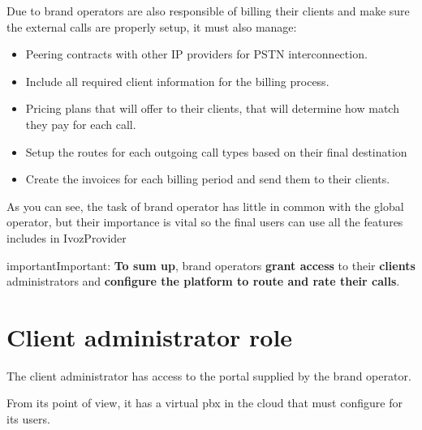 \documentclass[letterpaper,10pt,english]{sphinxmanual}
\begin{document}
Due to brand operators are also responsible of billing their clients and
make sure the external calls are properly setup, it must also manage:
\begin{itemize}
\item {} 
Peering contracts with other IP providers for PSTN interconnection.

\item {} 
Include all required client information for the billing process.

\item {} 
Pricing plans that will offer to their clients, that will determine how
match they pay for each call.

\item {} 
Setup the routes for each outgoing call types based on their final
destination

\item {} 
Create the invoices for each billing period and send them to their
clients.

\end{itemize}

As you can see, the task of brand operator has little in common with the
global operator, but their importance is vital so the final users can use
all the features includes in IvozProvider
\label{basic_concepts/operation_roles/index:brand-responsibilities}
\begin{notice}{important}{Important:}
\textbf{To sum up}, brand operators \textbf{grant access} to their
\textbf{clients} administrators and \textbf{configure the platform
to route and rate their calls}.
\end{notice}


\section{Client administrator role}
\label{basic_concepts/operation_roles/index:client-administrator-role}
The client administrator has access to the portal supplied by the brand
operator.

From its point of view, it has a virtual pbx in the cloud that must
configure for its users.
\end{document}
